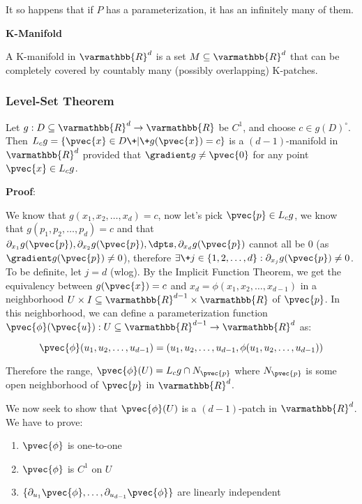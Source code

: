 \documentclass[11 pt, twoside]{article}
\begin{document}
It so happens that if $P$ has a parameterization, it has an infinitely many of
them.

\textbf{K-Manifold}

A K-manifold in $\varmathbb{R}^d$ is a set $M \subseteq \varmathbb{R}^d$ that
can be completely covered by countably many (possibly overlapping) K-patches.

\subsubsection{Level-Set Theorem}

Let $g: D \subseteq \varmathbb{R}^d \to \varmathbb{R}$ be $C^1$, and choose $c
\in g(D)^\circ$. Then $L_c g = \{\pvec{x} \in D \+|\+ g(\pvec{x}) = c\}$ is a $(d
- 1)$-manifold in $\varmathbb{R}^d$ provided that $\gradient g \neq \pvec{0}$ for any
point $\pvec{x} \in L_c g$.

\textbf{Proof}:

We know that $g(x_1, x_2, \dots, x_d) = c$, now let's pick $\pvec{p} \in L_c g$,
we know that $g(p_1, p_2, \dots, p_d) = c$ and that $\partial_{x_1} g(\pvec{p}),
\partial_{x_2} g(\pvec{p}), \dpts, \partial_{x_d} g(\pvec{p})$ cannot all be 0 (as
$\gradient g(\pvec{p}) \neq 0$), therefore $\exists\+ j \in \{1,2,\dots,d\} :
\partial_{x_j} g(\pvec{p}) \neq 0$. To be definite, let $j = d$ (wlog). By the
Implicit Function Theorem, we get the equivalency between $g(\pvec{x}) = c$ and
$x_d = \phi(x_1, x_2, \dots, x_{d - 1})$ in a neighborhood $U \times I \subseteq
\varmathbb{R}^{d - 1} \times \varmathbb{R}$ of $\pvec{p}$. In this neighborhood,
we can define a parameterization function $\pvec{\phi} (\pvec{u}) :
U \subseteq \varmathbb{R}^{d - 1} \to \varmathbb{R}^d$ as: 

\[
\pvec{\phi}(u_1, u_2, \dots, u_{d-1}) = (u_1, u_2, \dots, u_{d - 1}, \phi(u_1,
u_2, \dots, u_{d - 1}))
\]

Therefore the range, $\pvec{\phi}(U) = L_c g \cap N_{\pvec{p}}$ where
$N_{\pvec{p}}$ is some open neighborhood of $\pvec{p}$ in $\varmathbb{R}^d$.

We now seek to show that $\pvec{\phi}(U)$ is a $(d-1)$-patch in
$\varmathbb{R}^d$. We have to prove:
\begin{enumerate}
\item $\pvec{\phi}$ is one-to-one
\item $\pvec{\phi}$ is $C^1$ on $U$
\item $\{\partial_{u_1} \pvec{\phi}, \dots, \partial_{u_{d - 1}}
\pvec{\phi}\}$ are linearly independent
\end{enumerate}
\end{document}
